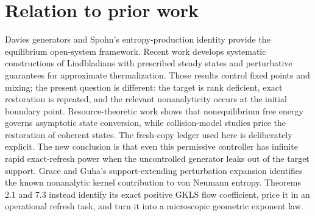 \documentclass[11pt,a4paper]{article}
\theoremstyle{remark}
\begin{document}
\section{Relation to prior work}
Davies generators and Spohn's entropy-production identity provide the equilibrium open-system framework. Recent work develops systematic constructions of Lindbladians with prescribed steady states and perturbative guarantees for approximate thermalization. Those results control fixed points and mixing; the present question is different: the target is rank deficient, exact restoration is repeated, and the relevant nonanalyticity occurs at the initial boundary point.
Resource-theoretic work shows that nonequilibrium free energy governs asymptotic state conversion, while collision-model studies price the restoration of coherent states. The fresh-copy ledger used here is deliberately explicit. The new conclusion is that even this permissive controller has infinite rapid exact-refresh power when the uncontrolled generator leaks out of the target support.
Grace and Guha's support-extending perturbation expansion identifies the known nonanalytic kernel contribution to von Neumann entropy. Theorems 2.1 and 7.3 instead identify its exact positive GKLS flow coefficient, price it in an operational refresh task, and turn it into a microscopic geometric exponent law.
\end{document}
